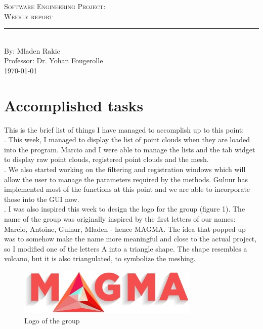 \documentclass[aps,letterpaper,11pt]{revtex4}
\newcommand{\labno}{Software Engineering Project}
\newcommand{\labtitle}{Weekly report}
\newcommand{\authorname}{Mladen Rakic}
\newcommand{\professor}{Dr. Yohan Fougerolle}
\begin{document}
  
\begin{titlepage}
\begin{center}
{\LARGE \textsc{\labno:} \\ \vspace{4pt}}
{\Large \textsc{\labtitle} \\ \vspace{4pt}} 
\rule[13pt]{\textwidth}{1pt} \\ \vspace{150pt}
{\large By: \authorname \\ \vspace{10pt}
Professor: \professor \\ \vspace{10pt}
\today}
\end{center}


\end{titlepage}%
\newpage
\section {Accomplished tasks}
 This is the brief list of things I have managed to accomplish up to this point:\\
. This week, I managed to display the list of point clouds when they are loaded into the program. Marcio and I were able to manage the lists and the tab widget to display raw point clouds, registered point clouds and the mesh.\\ 
. We also started working on the filtering and registration windows which will allow the user to manage the parameters required by the methods. Gulnur has implemented most of the functions at this point and we are able to incorporate those into the GUI now.\\ 
. I was also inspired this week to design the logo for the group (figure 1). The name of the group was originally inspired by the first letters of our names: Marcio, Antoine, Gulnur, Mladen - hence MAGMA. The idea that popped up was to somehow make the name more meaningful and close to the actual project, so I modified one of the letters A into a triangle shape. The shape resembles a volcano, but it is also triangulated, to symbolize the meshing.\\
\linebreak

\begin{figure}[!htb]
  \includegraphics[scale=1.0]{logo.jpg}
  \caption{Logo of the group}
  \label{fig:Kinect2}
\end{figure}
\end{document}
